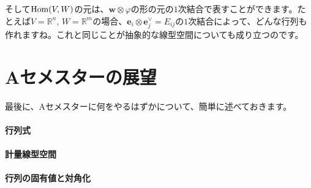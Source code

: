 そして$\operatorname{Hom}(V, W)$の元は、$\bm{w}\otimes\varphi$の形の元の$1$次結合で表すことができます。たとえば$V = \mathbb{R}^n$, $W = \mathbb{R}^m$の場合、$\bm{e}_i\otimes \bm{e}^{\vee}_j = E_{ij}$の$1$次結合によって、どんな行列も作れますね。これと同じことが抽象的な線型空間についても成り立つのです。

\section{Aセメスターの展望}

最後に、Aセメスターに何をやるはずかについて、簡単に述べておきます。

\paragraph{行列式}

\paragraph{計量線型空間}

\paragraph{行列の固有値と対角化}

